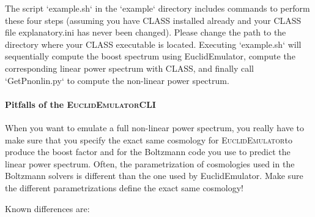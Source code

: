 \documentclass[american,11pt]{article}
\begin{document}
The script `example.sh` in the `example` directory includes commands to perform these four steps (assuming you have CLASS installed already and your CLASS file explanatory.ini has never been changed). Please change the path to the directory where your CLASS executable is located. Executing `example.sh` will sequentially compute the boost spectrum using EuclidEmulator, compute the corresponding linear power spectrum with CLASS, and finally call `GetPnonlin.py` to compute the non-linear power spectrum.

\paragraph{Pitfalls of the \textsc{EuclidEmulator}CLI}

When you want to emulate a full non-linear power spectrum, you really have to make sure that you specify the exact same cosmology for \textsc{EuclidEmulator}to produce the boost factor and for the Boltzmann code you use to predict the linear power spectrum. Often, the parametrization of cosmologies used in the Boltzmann solvers is different than the one used by EuclidEmulator. Make sure the different parametrizations define the exact same cosmology!

Known differences are:
\end{document}

